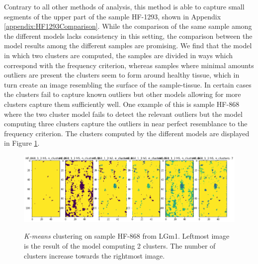 Contrary to all other methods of analysis, this method is able to capture small segments of the upper part of the sample HF-1293, shown in Appendix \ref{appendix:HF1293Comparison}. While the comparison of the same sample among the different models lacks consistency in this setting, the comparison between the model results among the different samples are promising. We find that the model in which two clusters are computed, the samples are divided in ways which correspond with the frequency criterion, whereas samples where minimal amounts outliers are present the clusters seem to form around healthy tissue, which in turn create an image resembling the surface of the sample-tissue. In certain cases the clusters fail to capture known outliers but other models allowing for more clusters capture them sufficiently well. One example of this is sample HF-868 where the two cluster model fails to detect the relevant outliers but the model computing three clusters capture the outliers in near perfect resemblance to the frequency criterion. The clusters computed by the different models are displayed in Figure \ref{fig:KM_HF868}.

\begin{figure}[H]

    \centering
{\includegraphics[width=15cm]{images/KMeans_full/LGm-1/HF-868_1_2.h5_0.png} }
\caption{\textit{K-means} clustering on sample HF-868 from LGm1. Leftmost image is the result of the model computing 2 clusters. The number of clusters increase towards the rightmost image.\label{fig:KM_HF868}}%

\end{figure}



